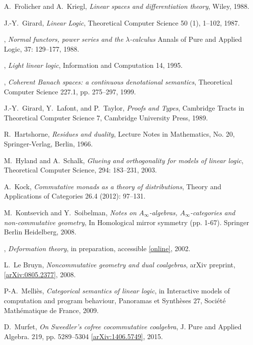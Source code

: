 \documentclass[english,letter paper,12pt,reqno]{article}
\theoremstyle{example}
\begin{document}
\begin{thebibliography}{BHLS03}
A.~Frolicher and A.~Kriegl, \textsl{Linear spaces and differentiation theory}, Wiley, 1988.

J.-Y.~Girard, \textsl{Linear Logic}, Theoretical Computer Science 50 (1), 1--102, 1987.

\bysame, \textsl{Normal functors, power series and the $\lambda$-calculus} Annals of Pure and Applied
Logic, 37: 129--177, 1988.

\bysame, \textsl{Light linear logic}, Information and Computation 14, 1995.

\bysame, \textsl{Coherent Banach spaces: a continuous denotational semantics}, Theoretical Computer Science 227.1, pp. 275--297, 1999.

J.-Y.~Girard, Y.~Lafont, and P.~Taylor, \textsl{Proofs and Types}, Cambridge Tracts in Theoretical Computer Science 7, Cambridge University Press, 1989.

R.~Hartshorne, \textsl{Residues and duality}, Lecture Notes in Mathematics, No. 20, Springer-Verlag, Berlin, 1966.

M.~Hyland and A.~Schalk, \textsl{Glueing and orthogonality for models of linear logic}, Theoretical Computer Science, 294: 183--231, 2003.

A.~Kock, \textsl{Commutative monads as a theory of distributions}, Theory and Applications of Categories 26.4 (2012): 97--131. 

M.~Kontsevich and Y.~Soibelman, \textsl{Notes on $A_\infty$-algebras, $A_\infty$-categories and non-commutative geometry}, In Homological mirror symmetry (pp. 1-67). Springer Berlin Heidelberg, 2008.

\bysame, \textsl{Deformation theory}, in preparation, accessible \href{https://www.math.ksu.edu/~soibel/Book-vol1.ps}{[online]}, 2002.

L.~Le Bruyn, \textsl{Noncommutative geometry and dual coalgebras}, arXiv preprint, \href{http://arxiv.org/abs/0805.2377}{[arXiv:0805.2377]}, 2008.

P-A.~Melli\`{e}s, \textsl{Categorical semantics of linear logic}, in Interactive models of computation and program behaviour, Panoramas et Synth\`{e}ses $27$, Soci\'{e}t\'{e} Math\'{e}matique de France, 2009.

D.~Murfet, \textsl{On Sweedler's cofree cocommutative coalgebra}, J. Pure and
Applied Algebra. 219, pp. 5289--5304 \href{http://arxiv.org/abs/1406.5749}{[arXiv:1406.5749]}, 2015.


\end{thebibliography}
\end{document}
